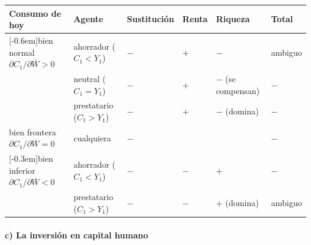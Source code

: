 \documentclass[11pt]{article}
\begin{document}
\begin{anotaciones}
\begin{tablacaja}
  \caption{Efectos de una subida del tipo de interés sobre el consumo de hoy, $C_1$}\label{tab:signos-tipo}
  \small
  \begin{tabular}{>{\centering\arraybackslash}m{2.4cm}>{\centering\arraybackslash}m{2.6cm}>{\centering\arraybackslash}m{2cm}>{\centering\arraybackslash}m{2cm}>{\centering\arraybackslash}m{2cm}>{\centering\arraybackslash}m{2cm}}
  \toprule
  \rowcolor{tceeazulpalido} \textbf{Consumo de hoy} & \textbf{Agente} & \textbf{Sustitución} & \textbf{Renta} & \textbf{Riqueza} & \textbf{Total}\\
  \midrule
  \multirow{3}{=}[-0.6em]{\centering\textcolor{tceeverde}{bien normal}\newline $\partial C_1/\partial\overline W>0$} & ahorrador ($C_1<Y_1$) & $-$ & $+$ & $-$ & \textcolor{tceeazul}{ambiguo}\\
  & neutral ($C_1=Y_1$) & $-$ & $+$ & $-$ (se compensan) & $-$\\
  & prestatario ($C_1>Y_1$) & $-$ & $+$ & $-$ (domina) & $-$\\
  \addlinespace[0.3em]
  \textcolor{tceedorado}{bien frontera}\newline $\partial C_1/\partial\overline W=0$ & cualquiera & $-$ & 0 & 0 & $-$\\
  \addlinespace[0.3em]
  \multirow{2}{=}[-0.3em]{\centering\textcolor{tceerojo}{bien inferior}\newline $\partial C_1/\partial\overline W<0$} & ahorrador ($C_1<Y_1$) & $-$ & $-$ & $+$ & $-$\\
  & prestatario ($C_1>Y_1$) & $-$ & $-$ & $+$ (domina) & \textcolor{tceeazul}{ambiguo}\\
  \bottomrule
  \end{tabular}
  \end{tablacaja}
\end{anotaciones}

\paragraph{c) La inversión en capital humano}
\end{document}
